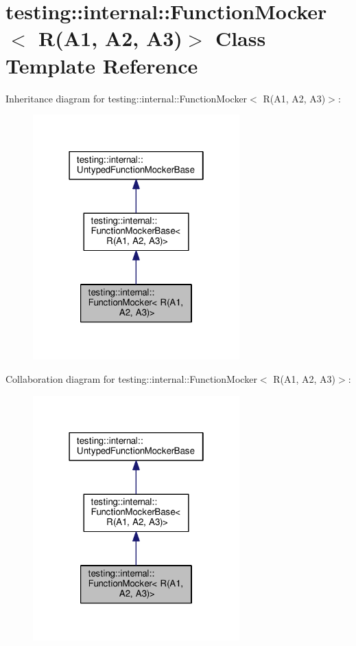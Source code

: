 \hypertarget{classtesting_1_1internal_1_1_function_mocker_3_01_r_07_a1_00_01_a2_00_01_a3_08_4}{}\section{testing\+:\+:internal\+:\+:Function\+Mocker$<$ R(A1, A2, A3)$>$ Class Template Reference}
\label{classtesting_1_1internal_1_1_function_mocker_3_01_r_07_a1_00_01_a2_00_01_a3_08_4}


Inheritance diagram for testing\+:\+:internal\+:\+:Function\+Mocker$<$ R(A1, A2, A3)$>$\+:
\nopagebreak
\begin{figure}[H]
\begin{center}
\leavevmode
\includegraphics[width=226pt]{classtesting_1_1internal_1_1_function_mocker_3_01_r_07_a1_00_01_a2_00_01_a3_08_4__inherit__graph}
\end{center}
\end{figure}


Collaboration diagram for testing\+:\+:internal\+:\+:Function\+Mocker$<$ R(A1, A2, A3)$>$\+:
\nopagebreak
\begin{figure}[H]
\begin{center}
\leavevmode
\includegraphics[width=226pt]{classtesting_1_1internal_1_1_function_mocker_3_01_r_07_a1_00_01_a2_00_01_a3_08_4__coll__graph}
\end{center}
\end{figure}
